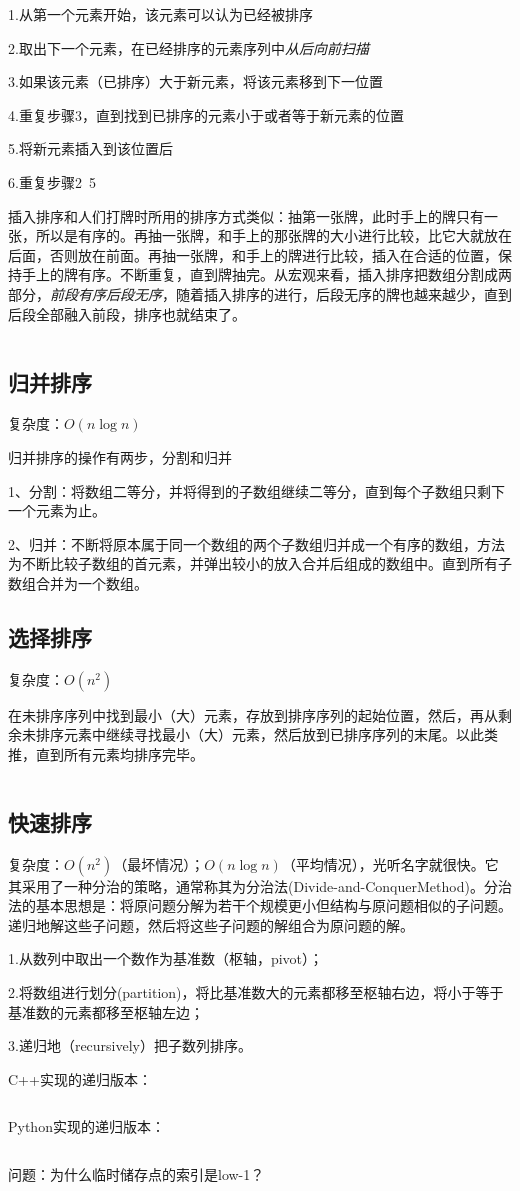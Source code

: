 1.从第一个元素开始，该元素可以认为已经被排序

2.取出下一个元素，在已经排序的元素序列中\textit{从后向前扫描}

3.如果该元素（已排序）大于新元素，将该元素移到下一位置

4.重复步骤3，直到找到已排序的元素小于或者等于新元素的位置

5.将新元素插入到该位置后

6.重复步骤2~5

插入排序和人们打牌时所用的排序方式类似：抽第一张牌，此时手上的牌只有一张，所以是有序的。再抽一张牌，和手上的那张牌的大小进行比较，比它大就放在后面，否则放在前面。再抽一张牌，和手上的牌进行比较，插入在合适的位置，保持手上的牌有序。不断重复，直到牌抽完。从宏观来看，插入排序把数组分割成两部分，\textit{前段有序后段无序}，随着插入排序的进行，后段无序的牌也越来越少，直到后段全部融入前段，排序也就结束了。

\inputminted{c++}{code/algorithm/insert_sort.cpp}

\subsection{归并排序}

复杂度：$ O(n\log n) $

归并排序的操作有两步，分割和归并

1、分割：将数组二等分，并将得到的子数组继续二等分，直到每个子数组只剩下一个元素为止。

2、归并：不断将原本属于同一个数组的两个子数组归并成一个有序的数组，方法为不断比较子数组的首元素，并弹出较小的放入合并后组成的数组中。直到所有子数组合并为一个数组。



\subsection{选择排序}

复杂度：$ O(n^2) $

在未排序序列中找到最小（大）元素，存放到排序序列的起始位置，然后，再从剩余未排序元素中继续寻找最小（大）元素，然后放到已排序序列的末尾。以此类推，直到所有元素均排序完毕。

\inputminted{cpp}{code/algorithm/select_sort.cpp}

\subsection{快速排序}

复杂度：$ O(n^2) $（最坏情况）；$ O(n\log n) $（平均情况），光听名字就很快。它其采用了一种分治的策略，通常称其为分治法(Divide-and-ConquerMethod)。分治法的基本思想是：将原问题分解为若干个规模更小但结构与原问题相似的子问题。递归地解这些子问题，然后将这些子问题的解组合为原问题的解。

1.从数列中取出一个数作为基准数（枢轴，pivot）；

2.将数组进行划分(partition)，将比基准数大的元素都移至枢轴右边，将小于等于基准数的元素都移至枢轴左边；

3.递归地（recursively）把子数列排序。

C++实现的递归版本：
\inputminted{c++}{code/algorithm/quick_sort.cpp}

Python实现的递归版本：
\inputminted{python}{code/algorithm/quick_sort.py}

问题：为什么临时储存点的索引是low-1？


